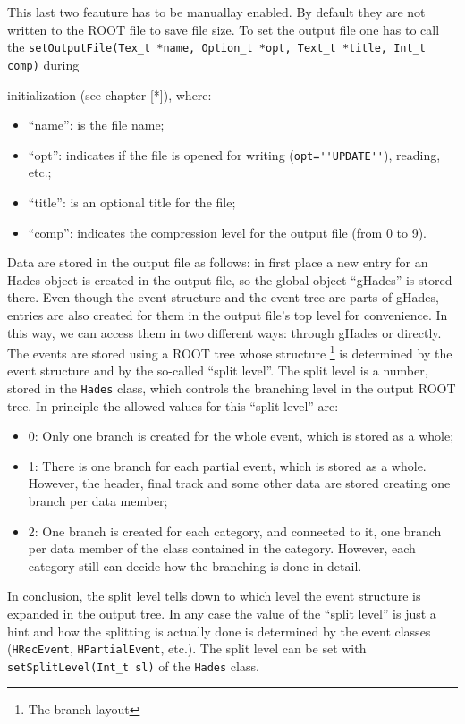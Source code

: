 This last two feauture has to be manuallay enabled. By default they are not written to
the ROOT file to save file size. To set the output file one has to call the 
\newline
\verb+setOutputFile(Tex_t *name, Option_t *opt, Text_t *title, Int_t comp)+ during 

initialization (see chapter [*]), where:
\begin{itemize}
    \item ``name'': is the file name; 
    \item ``opt'': indicates if the file is opened for writing (\verb+opt=''UPDATE''+), reading, etc.; 
    \item ``title'': is an optional title for the file; 
    \item ``comp'': indicates the compression level for the output file (from 0 to 9). 
\end{itemize}

Data are stored in the output file as follows: in first place a new entry for an Hades 
object is created in the output file, so the global object ``gHades'' is stored there. 
Even though the event structure and the event tree are parts of gHades, entries are 
also created for them in the output file's top level for convenience. In this way, we 
can access them in two different ways: through gHades or directly.
The events are stored using a ROOT tree whose structure \footnote{The branch layout} 
is determined by the event structure and by the so-called ``split level''. The split 
level is a number, stored in the \verb+Hades+ class, which controls the branching 
level in the output ROOT tree. In principle the allowed values for this ``split level'' are:

\begin{itemize}
    \item 0: Only one branch is created for the whole event, which is stored as a whole; 
    \item 1: There is one branch for each partial event, which is stored as a whole. 
    However, the header, final track and some other data are stored creating one branch per data member; 
    \item 2: One branch is created for each category, and connected to it, one branch 
    per data member of the class contained in the category. However, each category 
    still can decide how the branching is done in detail. 
\end{itemize}

In conclusion, the split level tells down to which level the event structure is expanded 
in the output tree. In any case the value of the ``split level'' is just a hint and how 
the splitting is actually done is determined by the event classes (\verb+HRecEvent+, 
\verb+HPartialEvent+, etc.). The split level can be set with \verb+setSplitLevel(Int_t sl)+ 
of the \verb+Hades+ class.

